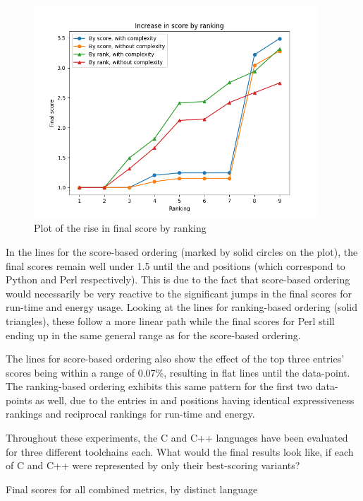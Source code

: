 \begin{figure}[h]
	\centering
	\includegraphics[width=0.95\textwidth]{figures/final_scores_plot.png}
	\caption{Plot of the rise in final score by ranking}
	\label{fig:graph:final_scores_plot}
\end{figure}

In the lines for the score-based ordering (marked by solid circles on the plot), the final scores remain well under 1.5 until the  and  positions (which correspond to Python and Perl respectively). This is due to the fact that score-based ordering would necessarily be very reactive to the significant jumps in the final scores for run-time and energy usage. Looking at the lines for ranking-based ordering (solid triangles), these follow a more linear path while the final scores for Perl still ending up in the same general range as for the score-based ordering.

The lines for score-based ordering also show the effect of the top three entries' scores being within a range of 0.07\%, resulting in flat lines until the  data-point. The ranking-based ordering exhibits this same pattern for the first two data-points as well, due to the entries in  and  positions having identical expressiveness rankings and reciprocal rankings for run-time and energy.

Throughout these experiments, the C and C++ languages have been evaluated for three different toolchains each. What would the final results look like, if each of C and C++ were represented by only their best-scoring variants?

\begin{table}[!htb]

\caption{Final scores for all combined metrics, by distinct language}
\label{table:totals:all_metrics_distinct}
\end{table}


